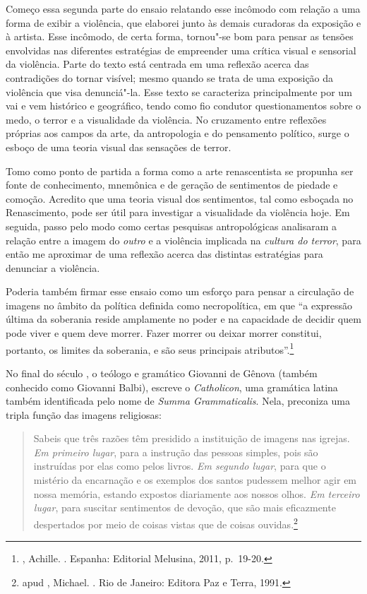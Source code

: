 Começo essa segunda parte do ensaio relatando esse incômodo com relação
a uma forma de exibir a violência, que elaborei junto às demais
curadoras da exposição e à artista. Esse incômodo, de certa forma,
tornou"-se bom para pensar as tensões envolvidas nas diferentes
estratégias de empreender uma crítica visual e sensorial da violência.
Parte do texto está centrada em uma reflexão acerca das contradições do
tornar visível; mesmo quando se trata de uma exposição da violência que
visa denunciá"-la. Esse texto se caracteriza principalmente por um vai e
vem histórico e geográfico, tendo como fio condutor questionamentos
sobre o medo, o terror e a visualidade da violência. No cruzamento entre
reflexões próprias aos campos da arte, da antropologia e do pensamento
político, surge o esboço de uma teoria visual das sensações de terror.

Tomo como ponto de partida a forma como a arte renascentista se propunha
ser fonte de conhecimento, mnemônica e de geração de sentimentos de
piedade e comoção. Acredito que uma teoria visual dos sentimentos, tal
como esboçada no Renascimento, pode ser útil para investigar a
visualidade da violência hoje. Em seguida, passo pelo modo como certas
pesquisas antropológicas analisaram a relação entre a imagem do
\emph{outro} e a violência implicada na \emph{cultura do terror}, para
então me aproximar de uma reflexão acerca das distintas estratégias para
denunciar a violência.

Poderia também firmar esse ensaio como um esforço para pensar a
circulação de imagens no âmbito da política definida como necropolítica,
em que ``a expressão última da soberania reside amplamente no poder e na
capacidade de decidir quem pode viver e quem deve morrer. Fazer morrer
ou deixar morrer constitui, portanto, os limites da soberania, e são
seus principais atributos''.\footnote{, Achille.
  {}. Espanha: Editorial Melusina, 2011, p.~19-20.}

\asterisc

No final do século , o teólogo e gramático Giovanni de Gênova
(também conhecido como Giovanni Balbi), escreve o \emph{Catholicon}, uma
gramática latina também identificada pelo nome de \emph{Summa
Grammaticalis}. Nela, preconiza uma tripla função das imagens
religiosas:

\begin{quote}
Sabeis que três razões têm presidido a instituição de imagens nas
igrejas. \emph{Em primeiro lugar}, para a instrução das pessoas simples,
pois são instruídas por elas como pelos livros. \emph{Em segundo lugar},
para que o mistério da encarnação e os exemplos dos santos pudessem
melhor agir em nossa memória, estando expostos diariamente aos nossos
olhos. \emph{Em terceiro lugar}, para suscitar sentimentos de devoção,
que são mais eficazmente despertados por meio de coisas vistas que de
coisas ouvidas.\footnote{ apud , Michael. {}. Rio de Janeiro: Editora Paz e Terra, 1991.} %
\end{quote}

